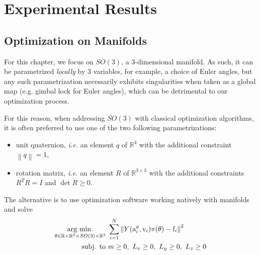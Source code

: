 \section{Experimental Results}
\label{sec:single-body-experimental-results}
\subsection{Optimization on Manifolds}

For this chapter, we focus on $SO(3)$, a 3-dimensional manifold. As such, it can be parametrized \emph{locally} by $3$ variables, for example, a choice of Euler angles, but any such parametrization necessarily exhibits singularities when taken as a global map (e.g. gimbal lock for Euler angles), which can be detrimental to our optimization process.

For this reason, when addressing $SO(3)$ with classical optimization algorithms, it is often preferred to use one of the two following parametrizations:
\begin{itemize}
    \item unit quaternion, \emph{i.e.} an element $q$ of $\mathbb{R}^4$ with the additional constraint $\left\|q\right\| = 1$,
    \item rotation matrix, \emph{i.e.} an element $R$ of $\mathbb{R}^{3 \times 3}$ with the additional constraints $R^T R = I$ and $\det{R} \geq 0$. 
\end{itemize}

The alternative is to use optimization software working natively with manifolds~\citep{brossette2015humanoid}\citep{absil:book:2008} and solve
\begin{align}
\label{eq:finalProblem}
    \operatorname*{arg\ min.}_{\theta \in \mathbb{R}\times\mathbb{R}^3\times SO(3) \times \mathbb{R}^3} &\ \sum_{i = 1}^N \left\| Y({\rm a}^g_i, {\rm v}_i) \pi(\theta) - {\rm f}_i \right\|^2 \\
    \mbox{subj. to} &\ m \geq 0,\ L_x \geq 0,\ L_y \geq 0,\ L_z \geq 0
\end{align}

